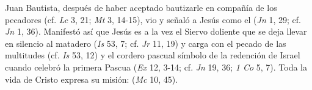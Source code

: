  Juan Bautista, después de haber aceptado bautizarle en compañía de los pecadores (cf. \emph{Lc} 3, 21; \emph{Mt} 3, 14-15), vio y señaló a Jesús como el  (\emph{Jn} 1, 29; cf. \emph{Jn} 1, 36). Manifestó así que Jesús es a la vez el Siervo doliente que se deja llevar en silencio al matadero (\emph{Is} 53, 7; cf. \emph{Jr} 11, 19) y carga con el pecado de las multitudes (cf. \emph{Is} 53, 12) y el cordero pascual símbolo de la redención de Israel cuando celebró la primera Pascua (\emph{Ex} 12, 3-14; cf. \emph{Jn} 19, 36; \emph{1 Co} 5, 7). Toda la vida de Cristo expresa su misión:  (\emph{Mc} 10, 45).